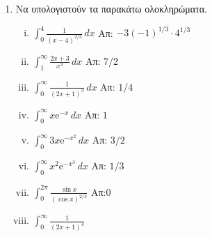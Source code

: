 \begin{enumerate}
  \item Να υπολογιστούν τα παρακάτω ολοκληρώματα.
    \begin{enumerate}[i)]
      \item $ \int _{0}^{4} \frac{1}{(x-4)^{2/3}} \,{dx} $ \hfill Απ: $ -3(-1)^{1/3}
        \cdot 4^{1/3} $  
      \item $ \int _{1}^{\infty} \frac{2x+3}{x^{3}} \,{dx} $ \hfill Απ: $ 7/2 $ 
      \item $ \int _{0}^{\infty} \frac{1}{(2x+1)^{3}} \,{dx} $ \hfill Απ: $ 1/4 $ 
      \item $ \int _{0}^{\infty} x \mathrm{e}^{-x}\,{dx} $ \hfill Απ: $ 1 $ 
      \item $ \int _{0}^{\infty} 3x \mathrm{e}^{-x^{2}}\,{dx} $ \hfill Απ: $ 3/2 $  
      \item $ \int _{0}^{\infty} x^{2} \mathrm{e}^{-x^{3}}\,{dx} $ \hfill Απ: $1/3 $ 
      \item $ \int _{0}^{2 \pi} \frac{\sin{x}}{(\cos{x})^{2/3}} $ \hfill Απ:$ 0 $  
      \item $ \int _{0}^{\infty} \frac{1}{(2x+1)^{4}} $
    \end{enumerate}
    

\end{enumerate}


